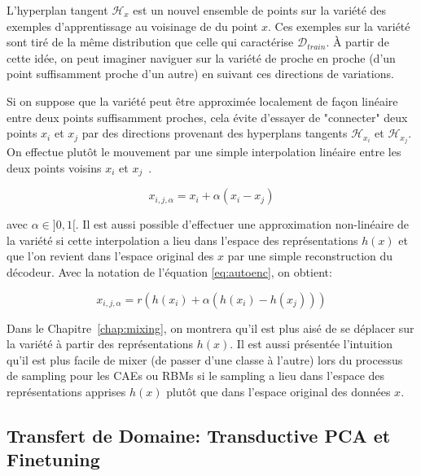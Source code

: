 L'hyperplan tangent $\mathcal{H}_{x}$ est un nouvel ensemble de points sur la
variété des exemples d'apprentissage au voisinage de du point $x$. Ces exemples
sur la variété sont tiré de la même distribution que celle qui caractérise
$\mathcal{D}_{train}$. À partir de cette idée, on peut imaginer naviguer sur la
variété de proche en proche (d'un point suffisamment proche d'un autre) en
suivant ces directions de variations.

Si on suppose que la variété peut être approximée localement de façon linéaire
entre deux points suffisamment proches, cela évite d'essayer de "connecter"
deux points $x_i$ et $x_j$ par des directions provenant des hyperplans tangents
$\mathcal{H}_{x_i}$ et $\mathcal{H}_{x_j}$. On effectue plutôt le mouvement par une
simple interpolation linéaire entre les deux points voisins $x_{i}$ et $x_{j}$~\citep{Mesnil-et-al-LW2012}.

\begin{equation}
x_{i,j,\alpha} = x_{i} + \alpha (x_{i} - x_{j})
\end{equation}

avec $\alpha \in ]0,1[$. Il est aussi possible d'effectuer une approximation
non-linéaire de la variété si cette interpolation a lieu dans l'espace des
représentations $h(x)$ et que l'on revient dans l'espace original des $x$ par une
simple reconstruction du décodeur. Avec la notation de l'équation
\ref{eq:autoenc}, on obtient:

\begin{equation}
x_{i,j,\alpha} = r(h(x_{i}) + \alpha (h(x_{i}) - h(x_{j})))
\end{equation}

Dans le Chapitre~\ref{chap:mixing}, on montrera qu'il est plus aisé de se déplacer sur la
variété à partir des représentations $h(x)$.  Il est aussi présentée
l'intuition qu'il est plus facile de mixer (de passer d'une classe à l'autre)
lors du processus de sampling  pour les CAEs ou RBMs si le sampling a lieu dans
l'espace des représentations apprises $h(x)$ plutôt que dans l'espace
original des données $x$.

\subsection{Transfert de Domaine: Transductive PCA et Finetuning}

